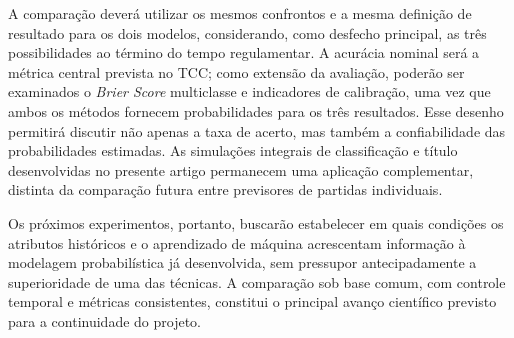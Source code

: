\documentclass[12pt]{article}
\begin{document}
A comparação deverá utilizar os mesmos confrontos e a mesma definição de resultado para os dois modelos, considerando, como desfecho principal, as três possibilidades ao término do tempo regulamentar. A acurácia nominal será a métrica central prevista no TCC; como extensão da avaliação, poderão ser examinados o \textit{Brier Score} multiclasse e indicadores de calibração, uma vez que ambos os métodos fornecem probabilidades para os três resultados. Esse desenho permitirá discutir não apenas a taxa de acerto, mas também a confiabilidade das probabilidades estimadas. As simulações integrais de classificação e título desenvolvidas no presente artigo permanecem uma aplicação complementar, distinta da comparação futura entre previsores de partidas individuais.

Os próximos experimentos, portanto, buscarão estabelecer em quais condições os atributos históricos e o aprendizado de máquina acrescentam informação à modelagem probabilística já desenvolvida, sem pressupor antecipadamente a superioridade de uma das técnicas. A comparação sob base comum, com controle temporal e métricas consistentes, constitui o principal avanço científico previsto para a continuidade do projeto.



\end{document}

